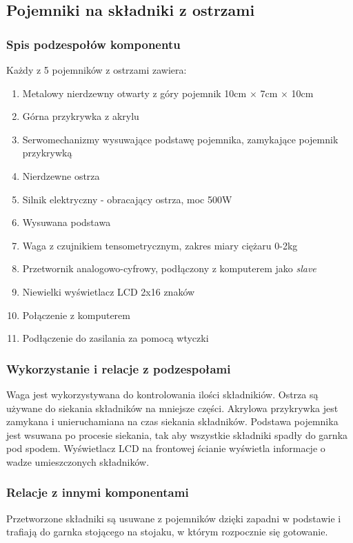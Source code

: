 \documentclass[12pt,a4paper,notitlepage]{article}
\begin{document}
\subsection{Pojemniki na składniki z ostrzami}
\subsubsection{Spis podzespołów komponentu}
Każdy z 5 pojemników z ostrzami zawiera:
\begin{enumerate}
  \item Metalowy nierdzewny otwarty z góry pojemnik 10cm $\times$ 7cm $\times$ 10cm
  \item Górna przykrywka z akrylu
  \item Serwomechanizmy wysuwające podstawę pojemnika, zamykające pojemnik przykrywką
  \item Nierdzewne ostrza
  \item Silnik elektryczny - obracający ostrza, moc 500W
  \item Wysuwana podstawa
  \item Waga z czujnikiem tensometrycznym, zakres miary ciężaru 0-2kg
  \item Przetwornik analogowo-cyfrowy, podłączony z komputerem jako \emph{slave}
  \item Niewielki wyświetlacz LCD 2x16 znaków
  \item Połączenie z komputerem
  \item Podłączenie do zasilania za pomocą wtyczki
\end{enumerate}
 
\subsubsection{Wykorzystanie i relacje z podzespołami}
Waga jest wykorzystywana do kontrolowania ilości składnikiów. Ostrza są używane do siekania składników na mniejsze części. Akrylowa przykrywka jest zamykana i unieruchamiana na czas siekania składników. Podstawa pojemnika jest wsuwana po procesie siekania, tak aby wszystkie składniki spadły do garnka pod spodem. Wyświetlacz LCD na frontowej ścianie wyświetla informacje o wadze umieszczonych składników.

\subsubsection{Relacje z innymi komponentami}
Przetworzone składniki są usuwane z pojemników dzięki zapadni w podstawie i trafiają do garnka stojącego na stojaku, w którym rozpocznie się gotowanie.
\end{document}
